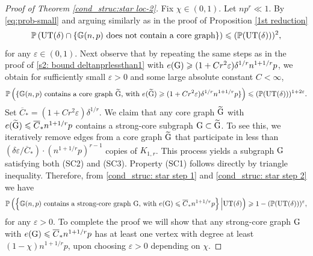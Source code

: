 \documentclass[a4paper,11pt,english,reqno]{amsart}
\numberwithin{equation}{section}
\renewcommand{\leq}{\leqslant}
\renewcommand{\geq}{\geqslant}
\newcommand{\cstar}{\overline{C}_{*}}
\newcommand{\UT}{\textup{UT}(\delta)}
\renewcommand{\P}{\mathbb{P}}
\newcommand{\G}{\mathbb{G}}
\newcommand{\tu}[1]{\textup{#1}}
\begin{document}
	\begin{proof}[Proof of Theorem \ref{cond_struc:star loc-2}]
		Fix $\chi \in (0,1)$.
		Let %
		$np^{r}\ll1$. By \eqref{eq:prob-small} and arguing similarly as in the proof of Proposition \ref{1st reduction} %
		\begin{equation}
			\label{cond_struc: star step 1}
			\P\left(\UT\cap\left\{ \G(n,p)\tu{ does not contain a core graph} \right\}\right) \leq  (\P(\UT))^2,
		\end{equation}
		for any $\varepsilon \in (0,1)$. Next observe that by repeating the same steps as in the proof of \eqref{s2: bound deltanprlessthan1} with $e(\tu{G})\geq (1+C r^{2}\varepsilon) \delta^{1/r}n^{1+1/r}p$, we obtain for sufficiently small $\varepsilon>0$ and some large absolute constant $C < \infty$,
		\begin{equation}
			\label{cond_struc: star step 2}
			\P\left(\{\G(n,p)\tu{ contains a core graph $\widetilde{\tu{G}}$, with } e(\widetilde{\tu{G}})\geq (1+C r^{2}\varepsilon)\delta^{1/r}n^{1+1/r}p\}\right) \leq  (\P(\UT))^{1+2\varepsilon}.
		\end{equation}
		Set $\cstar = (1+C r^{2}\varepsilon)\delta^{1/r}$. We claim that any core graph $\widetilde{\tu{G}}$ with $e(\widetilde{\tu{G}})\leq \cstar n^{1+1/r}p$ contains a strong-core subgraph $\tu{G}\subset \widetilde{\tu{G}}$. To see this, we iteratively remove edges from a core graph $\widetilde{\tu{G}}$ that participate in less than $(\delta \varepsilon/\cstar)\cdot (n^{1+1/r}p)^{r-1}$ copies of $K_{1,r}$. This process yields a subgraph $\tu{G}$ satisfying both (SC2) and (SC3). Property (SC1) follows directly by triangle inequality. Therefore, from \eqref{cond_struc: star step 1} and \eqref{cond_struc: star step 2} we have
		\begin{equation}
			\label{reduction to strong core graphs}
			\P\left(\left\{\G(n,p)\tu{ contains a strong-core graph G, with }e(\tu{G})\leq \cstar n^{1+1/r}p\right\}\Big| \UT \right)\geq 1- (\P(\UT))^{\varepsilon},
		\end{equation}
		for any $\varepsilon >0$. To complete the proof we will show that any strong-core graph $\tu{G}$ with $e(\tu{G}) \leq \overline{C}_*n^{1+1/r} p$ has at least one vertex with degree at least $(1-\chi)n^{1+1/r} p$, upon choosing $\varepsilon >0$ depending on $ \chi$. 
		

\end{proof}
\end{document}
